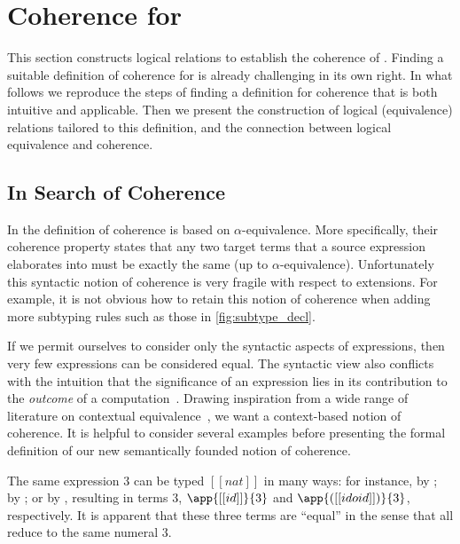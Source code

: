 
\section{Coherence for \name}
\label{sec:cohe}

This section constructs logical relations to
establish the coherence of \name. Finding a
suitable definition of coherence for \name is already challenging in its own
right. In what follows we reproduce the steps of finding a definition for coherence
that is both intuitive and applicable. Then we present the
construction of logical (equivalence) relations tailored to this 
definition, and the connection between logical equivalence and coherence.



\subsection{In Search of Coherence}

In \oname the definition of coherence is based on
$\alpha$-equivalence. More specifically, their coherence property states that
any two target terms that a source expression elaborates into must be exactly the same (up to
$\alpha$-equivalence). Unfortunately this syntactic notion of coherence is
very fragile with respect to extensions.
For example, it is not obvious how to retain this notion of coherence when adding more subtyping
rules such as those in \cref{fig:subtype_decl}.

If we permit ourselves to consider only the syntactic aspects of expressions,
then very few expressions can be considered equal. The syntactic view also conflicts
with the intuition that the significance of an expression lies in its
contribution to the \textit{outcome} of a computation~\cite{Harper_2016}.
Drawing inspiration from a wide range of literature on contextual
equivalence~\cite{morris1969lambda}, we want a context-based notion of
coherence. It is helpful to consider several examples before presenting the
formal definition of our new semantically founded notion of coherence.

\begin{example} \label{eg:1}
The same \name expression $3$ can be typed $[[nat]]$ in many ways: for instance, by ; by
; or by , resulting in \tname
terms $3$, $\app{[[id]]}{3}$ and $\app{([[id o id]])}{3}$, respectively. It is apparent
that these three \tname terms are ``equal'' in the sense that all reduce to the
same numeral $3$.
\end{example}


